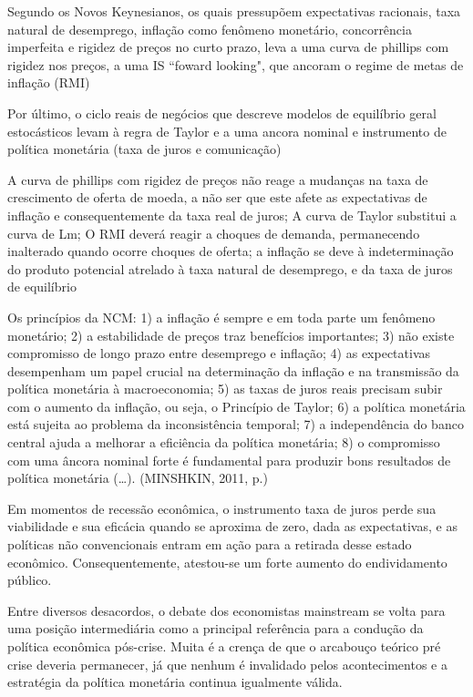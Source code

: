 \documentclass[report]{uftex}
\begin{document}
Segundo os Novos Keynesianos, os quais pressupõem expectativas racionais, taxa natural de desemprego, inflação como fenômeno monetário, concorrência imperfeita e rigidez de preços no curto prazo, leva a uma curva de phillips com rigidez nos preços, a uma IS ``foward looking", que ancoram o regime de metas de inflação (RMI)

Por último, o ciclo reais de negócios que descreve modelos de equilíbrio geral estocásticos levam à regra de Taylor e a uma ancora nominal e instrumento de política monetária (taxa de juros e comunicação)

A curva de phillips com rigidez de preços não reage a mudanças na taxa de crescimento de oferta de moeda, a não ser que este afete as expectativas de inflação e consequentemente da taxa real de juros; A curva de Taylor substitui a curva de Lm; O RMI deverá reagir a choques de demanda, permanecendo inalterado quando ocorre choques de oferta; a inflação se deve à indeterminação do produto potencial atrelado à taxa natural de desemprego, e da taxa de juros de equilíbrio

Os princípios da NCM: 1) a inflação é sempre e em toda parte um fenômeno monetário; 2) a estabilidade de preços traz benefícios importantes; 3) não existe compromisso de longo prazo entre desemprego e inflação; 4) as expectativas desempenham um papel crucial na determinação da inflação e na transmissão da política monetária à macroeconomia; 5) as taxas de juros reais precisam subir com o aumento da inflação, ou seja, o Princípio de Taylor; 6) a política monetária está sujeita ao problema da inconsistência temporal; 7) a independência do banco central ajuda a melhorar a eficiência da política monetária; 8) o compromisso com uma âncora nominal forte é fundamental para produzir bons resultados de política monetária (…). (MINSHKIN, 2011, p.)

Em momentos de recessão econômica, o instrumento taxa de juros perde sua viabilidade e sua eficácia quando se aproxima de zero, dada as expectativas, e as políticas não convencionais entram em ação para a retirada desse estado econômico. Consequentemente, atestou-se um forte aumento do endividamento público.

Entre diversos desacordos, o debate dos economistas mainstream se volta para uma posição intermediária como a principal referência para a condução da política econômica pós-crise. Muita é a crença de que o arcabouço teórico pré crise deveria permanecer, já que nenhum é invalidado pelos acontecimentos e a estratégia da política monetária continua igualmente válida. 
\end{document}
